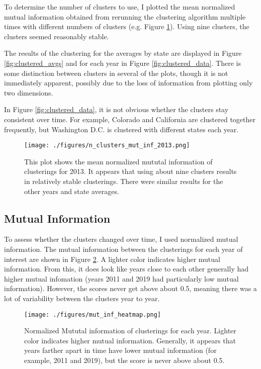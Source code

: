 \documentclass[11pt]{article}
\begin{document}
To determine the number of clusters to use, I plotted the mean normalized mutual information obtained from rerunning the clustering algorithm multiple times with different numbers of clusters (e.g. Figure \ref{fig:n_clusters}). Using nine clusters, the clusters seemed reasonably stable. 

The results of the clustering for the averages by state are displayed in Figure \ref{fig:clustered_avgs} and for each year in Figure \ref{fig:clustered_data}. There is some distinction between clusters in several of the plots, though it is not immediately apparent, possibly due to the loss of information from plotting only two dimensions.

In Figure \ref{fig:clustered_data}, it is not obvious whether the clusters stay consistent over time. For example, Colorado and California are clustered together frequently, but Washington D.C. is clustered with different states each year. 

\begin{figure}[htbp]
\centering
\texttt{[image: ./figures/n\_clusters\_mut\_inf\_2013.png]}
\caption{\label{fig:n_clusters} This plot shows the mean normalized mututal information of clusterings for 2013. It appears that using about nine clusters results in relatively stable clusterings. There were similar results for the other years and state averages.}
\end{figure}

\subsection{Mutual Information}
To assess whether the clusters changed over time, I used normalized mutual information. The mutual information between the clusterings for each year of interest are shown in Figure \ref{fig:mut_inf}. A lighter color indicates higher mutual information. From this, it does look like years close to each other generally had higher mutual infomation (years 2011 and 2019 had particularly low mutual information). However, the scores never get above about 0.5, meaning there was a lot of variability between the clusters year to year. 


\begin{figure}[htbp]
\centering
\texttt{[image: ./figures/mut\_inf\_heatmap.png]}
\caption{\label{fig:mut_inf} Normalized Mututal information of clusterings for each year. Lighter color indicates higher mutual information. Generally, it appears that years farther apart in time have lower mutual information (for example, 2011 and 2019), but the score is never above about 0.5.}
\end{figure}
\end{document}
